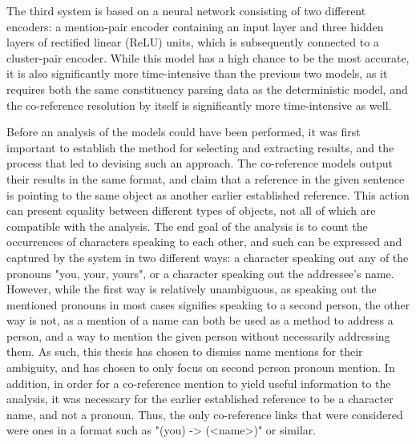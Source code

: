 \documentclass[a4paper, 11pt]{article}
\begin{document}
The third system is based on a neural network \citep{clark2016deep,clark2016impr} consisting of two different encoders: a mention-pair encoder containing an input layer and three hidden layers of rectified linear (ReLU) units, which is subsequently connected to a cluster-pair encoder. While this model has a high chance to be the most accurate, it is also significantly more time-intensive than the previous two models, as it requires both the same constituency parsing data as the deterministic model, and the co-reference resolution by itself is significantly more time-intensive as well.

Before an analysis of the models could have been performed, it was first important to establish the method for selecting and extracting results, and the process that led to devising such an approach. The co-reference models output their results in the same format, and claim that a reference in the given sentence is pointing to the same object as another earlier established reference. This action can present equality between different types of objects, not all of which are compatible with the analysis. The end goal of the analysis is to count the occurrences of characters speaking to each other, and such can be expressed and captured by the system in two different ways: a character speaking out any of the pronouns "you, your, yours", or a character speaking out the addressee's name. However, while the first way is relatively unambiguous, as speaking out the mentioned pronouns in most cases signifies speaking to a second person, the other way is not, as a mention of a name can both be used as a method to address a person, and a way to mention the given person without necessarily addressing them. As such, this thesis has chosen to dismiss name mentions for their ambiguity, and has chosen to only focus on second person pronoun mention. In addition, in order for a co-reference mention to yield useful information to the analysis, it was necessary for the earlier established reference to be a character name, and not a pronoun. Thus, the only co-reference links that were considered were ones in a format such as "(you) -> (<name>)" or similar.
\end{document}
